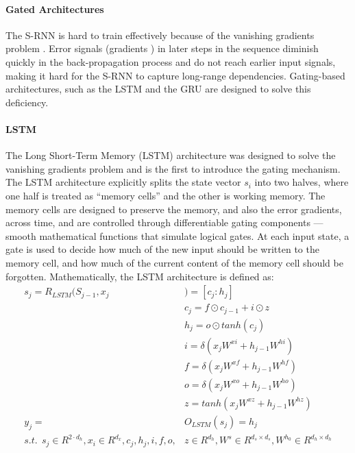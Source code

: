 \documentclass{article}
\begin{document}
\paragraph{Gated Architectures}
The S-RNN is hard to train effectively because of the vanishing gradients problem \citep{DBLP:journals/corr/abs-1211-5063}. Error signals (gradients ) in later steps in the sequence diminish quickly in the back-propagation process and do not reach earlier input signals, making it hard for the S-RNN to capture long-range dependencies. Gating-based architectures, such as the LSTM \citep{hochreiter1997long} and the GRU \citep{DBLP:conf/emnlp/ChoMGBBSB14} are designed to solve this deficiency.
\paragraph{LSTM}
The Long Short-Term Memory (LSTM) architecture \citep{hochreiter1997long} was designed to solve the vanishing gradients problem and is the first to introduce the gating mechanism. The LSTM architecture explicitly splits the state vector $s_i$ into two halves, where one half is treated as “memory cells” and the other is working memory. The memory cells are designed to preserve the memory, and also the error gradients, across time, and are controlled through differentiable gating components —smooth mathematical functions that simulate logical gates. At each input state, a gate is used to decide how much of the new input should be written to the memory cell, and how much of the current content of the memory cell should be forgotten. Mathematically, the LSTM architecture is defined as:
\begin{align}
	s_j=R_{LSTM}(S_{j-1},x_j&)=[c_j:h_j] \\&c_j=f \odot c_{j-1} +i \odot z \\ &h_j=o \odot tanh(c_j)\\&i=\delta (x_j W^{xi}+h_{j-1}W^{hi})\\&f=\delta (x_j W^{xf}+h_{j-1}W^{hf})\\&o=\delta (x_j W^{xo}+h_{j-1}W^{ho})\\&z=tanh(x_j W^{xz}+h_{j-1}W^{hz})\\y_j=&O_{LSTM}(s_j)=h_j\\  s.t. \ \ s_j\in R^{2 \cdot{d_{h}}},x_i \in R^{d_{x}},c_j,h_j,i,f,o,&z \in R^{d_h},W^s \in R^{d_s \times d_{s}},W^{h_0} \in R^{d_h \times d_{h}}
\end{align}
\end{document}
